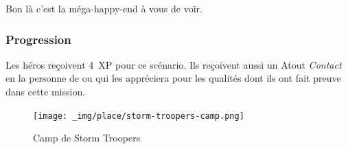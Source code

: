 Bon là c’est la méga-happy-end à vous de voir.

\subsubsection{Progression}
Les héros reçoivent 4~XP pour ce scénario. Ils reçoivent aussi un Atout \textit{Contact} en la personne de  ou  qui les appréciera pour les qualités dont ils ont fait preuve dans cette mission.

\begin{figure}
    \centering
    \texttt{[image: \_img/place/storm-troopers-camp.png]}
    \caption{\label{fig:storm-troopers-camp}Camp de Storm Troopers}
\end{figure}